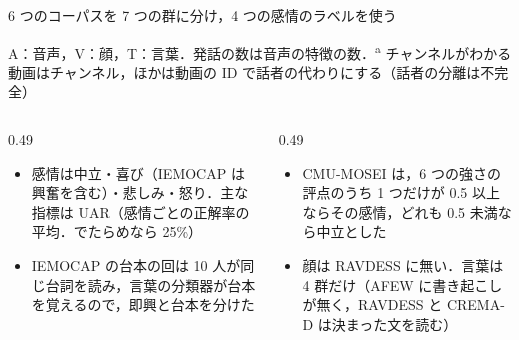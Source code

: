 \begin{frame}{6 つのコーパスを 7 つの群に分け，4 つの感情のラベルを使う}
  \vspace{0.1em}
  {\raggedright\tiny A：音声，V：顔，T：言葉．発話の数は音声の特徴の数．\textsuperscript{a} チャンネルがわかる動画はチャンネル，ほかは動画の ID で話者の代わりにする（話者の分離は不完全）\par}
  \vspace{0.2em}
  \begin{columns}[T,onlytextwidth]
    \begin{column}{0.49\textwidth}
      \begin{itemize}\scriptsize\setlength{\itemsep}{3pt}
        \item 感情は中立・喜び（IEMOCAP は興奮を含む）・悲しみ・怒り．主な指標は UAR（感情ごとの正解率の平均．でたらめなら 25\%）
        \item IEMOCAP の台本の回は 10 人が同じ台詞を読み，言葉の分類器が台本を覚えるので，即興と台本を分けた
      \end{itemize}
    \end{column}
    \begin{column}{0.49\textwidth}
      \begin{itemize}\scriptsize\setlength{\itemsep}{3pt}
        \item CMU-MOSEI は，6 つの強さの評点のうち 1 つだけが 0.5 以上ならその感情，どれも 0.5 未満なら中立とした
        \item 顔は RAVDESS に無い．言葉は 4 群だけ（AFEW に書き起こしが無く，RAVDESS と CREMA-D は決まった文を読む）
      \end{itemize}
    \end{column}
  \end{columns}
\end{frame}

